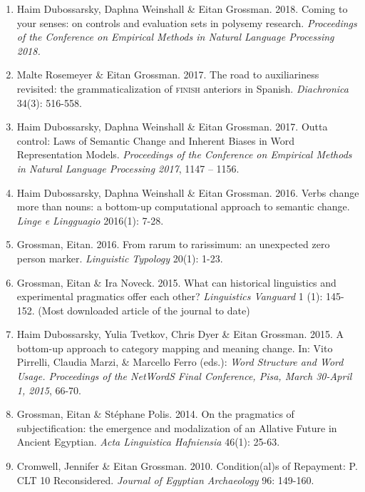 \documentclass[letterpaper,11pt]{article}
\begin{document}
\begin{enumerate}[resume]
\item {Haim Dubossarsky, Daphna Weinshall \& Eitan Grossman.} {2018.} Coming to your senses: on controls and evaluation sets in polysemy research. \textit{Proceedings of the Conference on Empirical Methods in Natural Language Processing 2018.}

\item	{Malte Rosemeyer \& Eitan Grossman.} {2017.} The road to auxiliariness revisited: the grammaticalization of \textsc{finish} anteriors in Spanish. \textit{Diachronica} 34(3): 516-558.

\item {Haim Dubossarsky, Daphna Weinshall \& Eitan Grossman.} {2017.} Outta control: Laws of Semantic Change and Inherent Biases in Word Representation Models. \textit{Proceedings of the Conference on Empirical Methods in Natural Language Processing 2017}, 1147 -- 1156.

\item {Haim Dubossarsky, Daphna Weinshall  \& Eitan Grossman.} {2016.} Verbs change more than nouns: a bottom-up computational approach to semantic change. \textit{Linge e Lingguagio} 2016(1): 7-28.

\item {Grossman, Eitan.} {2016.} From rarum to rarissimum: an unexpected zero person marker. \textit{Linguistic Typology} 20(1): 1-23.

\item {Grossman, Eitan \& Ira Noveck.} {2015.} What can historical linguistics and experimental pragmatics offer each other? \textit{Linguistics Vanguard} 1 (1): 145-152. (Most downloaded article of the journal to date)

\item {Haim Dubossarsky, Yulia Tvetkov, Chris Dyer \& Eitan Grossman.} {2015.} A bottom-up approach to category mapping and meaning change. In: Vito Pirrelli, Claudia Marzi, \& Marcello Ferro (eds.): \textit{Word Structure and Word Usage. Proceedings of the NetWordS Final Conference, Pisa, March 30-April 1, 2015}, 66-70.

\item {Grossman, Eitan \& St\'ephane Polis.} {2014.} On the pragmatics of subjectification: the emergence and modalization of an Allative Future in Ancient Egyptian. \textit{Acta Linguistica Hafniensia} 46(1): 25-63. 

\item {Cromwell, Jennifer  \& Eitan Grossman.} {2010.} Condition(al)s of Repayment: P. CLT 10 Reconsidered. \textit{Journal of Egyptian Archaeology} 96: 149-160.


\end{enumerate}
\end{document}
